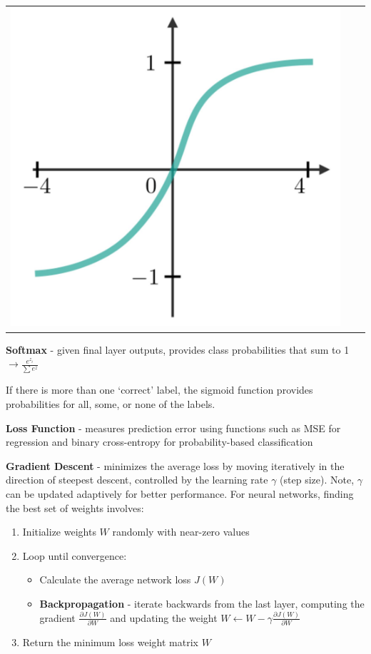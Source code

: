 \documentclass[10pt,landscape]{article}
\begin{document}
\begin{multicols}{3}
\begin{center}
\begin{tabular}{c|c|c}
            \includegraphics[scale = .047]{images/tanh.JPG}
        \end{tabular}
    \end{center}
    \textbf{Softmax} - given final layer outputs, provides class probabilities that sum to 1 $\to \frac{e^{z_i}}{\sum e^{z}}$

    If there is more than one `correct' label, the sigmoid function provides probabilities for all, some, or none of the labels.


    \smallskip
    \textbf{Loss Function} - measures prediction error using functions such as MSE for regression and binary cross-entropy for probability-based classification

    \smallskip
    \textbf{Gradient Descent} - minimizes the average loss by moving iteratively in the direction of steepest descent, controlled by the learning rate $\gamma$ (step size). Note, $\gamma$ can be updated adaptively for better performance. For neural networks, finding the best set of weights involves:
    \begin{enumerate}[leftmargin=5mm]
        \itemsep -.4mm
        \item Initialize weights $W$ randomly with near-zero values
        \item Loop until convergence:
              \begin{itemize}[label={--},leftmargin=4mm]
                  \itemsep -.4mm
                  \item Calculate the average network loss $J(W)$
                  \item \textbf{Backpropagation} - iterate backwards from the last layer, computing the gradient $\frac{\partial J(W)}{\partial W}$ and updating the weight $W \leftarrow W - \gamma \frac{\partial J(W)}{\partial W}$
              \end{itemize}
        \item Return the minimum loss weight matrix $W$
    \end{enumerate}


\end{multicols}
\end{document}
